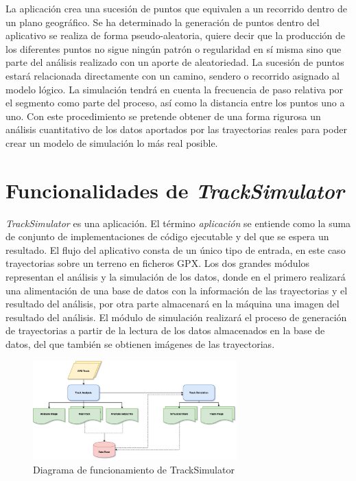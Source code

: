 La aplicación crea una sucesión de puntos que equivalen a un recorrido dentro de un plano geográfico. 
Se ha determinado la generación de puntos dentro del aplicativo se realiza de forma pseudo-aleatoria, quiere decir que la producción de los diferentes puntos no sigue ningún patrón o regularidad en sí misma sino que parte del análisis realizado con un aporte de aleatoriedad. La sucesión de puntos estará relacionada directamente con un camino, sendero o recorrido asignado al modelo lógico. La simulación tendrá en cuenta la frecuencia de paso relativa por el segmento como parte del proceso, así como la distancia entre los puntos uno a uno. Con este procedimiento se pretende obtener de una forma rigurosa un análisis cuantitativo de los datos aportados por las trayectorias reales para poder crear un modelo de simulación lo más real posible.

\section{Funcionalidades de \textit{TrackSimulator}}
\textit{TrackSimulator} es una aplicación. El término \textit{aplicación} se entiende como la suma de 
conjunto de implementaciones  de código ejecutable y del que se espera un resultado. El flujo del aplicativo consta de un único tipo de entrada, en este caso trayectorias sobre un terreno en ficheros \ac{GPX}. Los dos grandes módulos representan el análisis y la simulación de los datos, donde en el primero realizará una alimentación de una base de datos con la información de las trayectorias y el resultado del análisis, por otra parte almacenará en la máquina una imagen del resultado del análisis. El módulo de simulación realizará el proceso de generación de trayectorias a partir de la lectura de los datos almacenados en la base de datos, del que también se obtienen imágenes de las trayectorias.

\begin{figure}[!htb]
\begin{center}
\includegraphics[width=0.7\textwidth]{./Imagenes/TrackSimulatorDiagram.png}
\caption{Diagrama de funcionamiento de TrackSimulator}
\label{figure:TrackSimulatorDiagram}
\end{center}
\end{figure}

